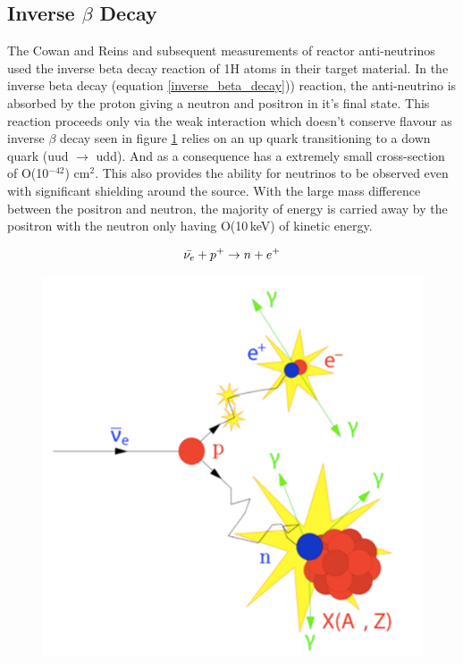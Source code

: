\subsection{Inverse $\beta$ Decay}
The Cowan and Reins and subsequent measurements of reactor anti-neutrinos used the inverse beta decay reaction of 1H atoms in their target material. In the inverse beta decay (equation \ref{inverse_beta_decay})) reaction, the anti-neutrino is absorbed by the proton giving a neutron and positron in  it's final state. This reaction proceeds only via the weak interaction which doesn't conserve flavour as inverse $\beta$ decay seen in figure \ref{fig:inverse_beta_diagram} relies on an up quark transitioning to a down quark (uud $\rightarrow$ udd). And as a consequence has a extremely small cross-section of O(10$^{-42}$) cm$^2$\cite{Vogel_1999}. This also provides the ability for neutrinos to be observed even with significant shielding around the source. With the large mass difference between the positron and neutron, the majority of energy is carried away by the positron with the neutron only having O(10\,keV) of kinetic energy.

\begin{equation}
    \Bar{\nu_e} + p^+ \rightarrow n + e^+
    \label{inverse_beta_decay}
\end{equation}

\begin{figure}[!h]
  \centering
  \includegraphics[width=0.5\linewidth]{Chapter2/Figs/Raster/inverse_beta_diagram.png} 
  \label{fig:inverse_beta_diagram}
\end{figure}

